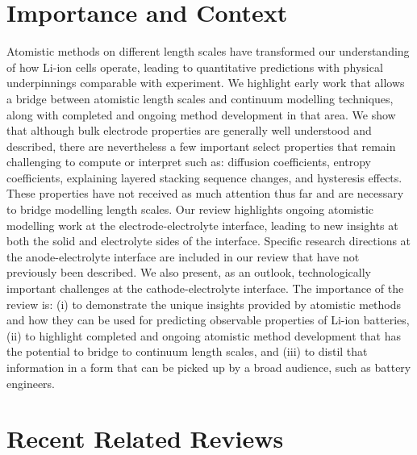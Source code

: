 \documentclass{article}
\begin{document}
\section*{Importance and Context}
Atomistic methods on different length scales have transformed our understanding of how Li-ion cells operate, leading to quantitative predictions with physical underpinnings comparable with experiment. We highlight early work that allows a bridge between atomistic length scales and continuum modelling techniques, along with completed and ongoing method development in that area. We show that although bulk electrode properties are generally well understood and described, there are nevertheless a few important select properties that remain challenging to compute or interpret such as: diffusion coefficients, entropy coefficients, explaining layered stacking sequence changes, and hysteresis effects. These properties have not received as much attention thus far and are necessary to bridge modelling length scales. Our review highlights ongoing atomistic modelling work at the electrode-electrolyte interface, leading to new insights at both the solid and electrolyte sides of the interface. Specific research directions at the anode-electrolyte interface are included in our review that have not previously been described. We also present, as an outlook, technologically important challenges at the cathode-electrolyte interface. The importance of the review is: (i) to demonstrate the unique insights provided by atomistic methods and how they can be used for predicting observable properties of Li-ion batteries, (ii) to highlight completed and ongoing atomistic method development that has the potential to bridge to continuum length scales, and (iii) to distil that information in a form that can be picked up by a broad audience, such as battery engineers.

\section*{Recent Related Reviews}
\end{document}
